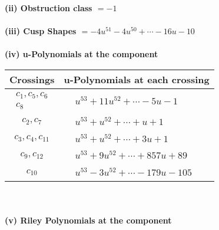 \documentclass[1p]{elsarticle_modified}
\theoremstyle{definition}
\begin{document}
\flushleft \textbf{(ii) Obstruction class $= -1$}\\~\\
\flushleft \textbf{(iii) Cusp Shapes $= -4 u^{51}-4 u^{50}+\cdots-16 u-10$}\\~\\
\newpage\renewcommand{\arraystretch}{1}
\flushleft \textbf{(iv) u-Polynomials at the component}\newline \\
\begin{tabular}{m{50pt}|m{274pt}}
Crossings & \hspace{64pt}u-Polynomials at each crossing \\
\hline $$\begin{aligned}c_{1},c_{5},c_{6}\\c_{8}\end{aligned}$$&$\begin{aligned}
&u^{53}+11 u^{52}+\cdots-5 u-1
\end{aligned}$\\
\hline $$\begin{aligned}c_{2},c_{7}\end{aligned}$$&$\begin{aligned}
&u^{53}+u^{52}+\cdots+u+1
\end{aligned}$\\
\hline $$\begin{aligned}c_{3},c_{4},c_{11}\end{aligned}$$&$\begin{aligned}
&u^{53}+u^{52}+\cdots+3 u+1
\end{aligned}$\\
\hline $$\begin{aligned}c_{9},c_{12}\end{aligned}$$&$\begin{aligned}
&u^{53}+9 u^{52}+\cdots+857 u+89
\end{aligned}$\\
\hline $$\begin{aligned}c_{10}\end{aligned}$$&$\begin{aligned}
&u^{53}-3 u^{52}+\cdots-179 u-105
\end{aligned}$\\
\hline
\end{tabular}\\~\\
\newpage\renewcommand{\arraystretch}{1}
\flushleft \textbf{(v) Riley Polynomials at the component}\newline \\
\end{document}
